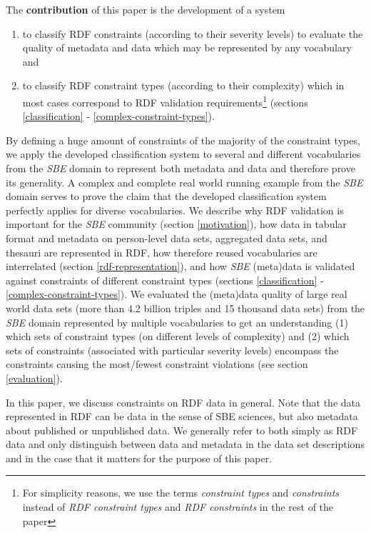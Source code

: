 \documentclass{llncs}
\begin{document}
The \textbf{contribution} of this paper is the development of a system 
\begin{enumerate}
	\item to classify RDF constraints (according to their severity levels) to evaluate the quality of metadata and data which may be represented by any vocabulary and 
	\item to classify RDF constraint types (according to their complexity) which in most cases correspond to RDF validation requirements\footnote{For simplicity reasons, we use the terms \emph{constraint types} and \emph{constraints} instead of \emph{RDF constraint types} and \emph{RDF constraints} in the rest of the paper} (sections \ref{classification} - \ref{complex-constraint-types}).
\end{enumerate}
By defining a huge amount of constraints of the majority of the constraint types,   
we apply the developed classification system to several and different vocabularies from the \emph{SBE} domain to represent both metadata and data and therefore prove its generality.
A complex and complete real world running example from the \emph{SBE} domain serves to prove the claim that the developed classification system perfectly applies for diverse vocabularies.
We describe why RDF validation is important for the \emph{SBE} community (section \ref{motivation}), 
how data in tabular format and metadata on person-level data sets, aggregated data sets, and thesauri are represented in RDF, 
how therefore reused vocabularies are interrelated (section \ref{rdf-representation}),
and how \emph{SBE} (meta)data is validated against constraints of different constraint types (sections \ref{classification} - \ref{complex-constraint-types}).
We evaluated the (meta)data quality of large real world data sets (more than 4.2 billion triples and 15 thousand data sets) from the \emph{SBE} domain represented by multiple vocabularies to get an understanding 
(1) which sets of constraint types (on different levels of complexity) and 
(2) which sets of constraints (associated with particular severity levels) encompass the constraints causing the most/fewest constraint violations (see section \ref{evaluation}).

In this paper, we discuss constraints on RDF data in general. Note that the data represented in RDF can be data in the sense of SBE sciences, but also metadata about published or unpublished data. We generally refer to both simply as RDF data and only distinguish between data and metadata in the data set descriptions and in the case that it matters for the purpose of this paper.
\end{document}
